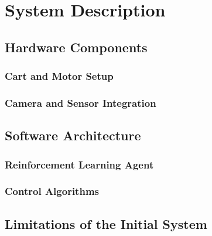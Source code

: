 \chapter{System Description}

\section{Hardware Components}
\subsection{Cart and Motor Setup}
\subsection{Camera and Sensor Integration}

\section{Software Architecture}
\subsection{Reinforcement Learning Agent}
\subsection{Control Algorithms}

\section{Limitations of the Initial System}